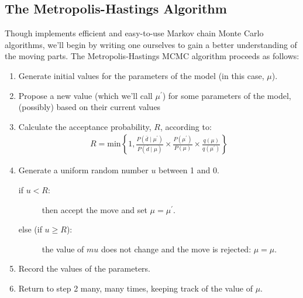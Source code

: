 \subsection{The Metropolis-Hastings Algorithm}\label{sect:MH_algorithm}
Though \RevBayes implements efficient and easy-to-use Markov chain Monte Carlo algorithms, we'll begin by writing one ourselves to gain a better understanding of the moving parts.
The Metropolis-Hastings MCMC algorithm \citep{Metropolis1953,Hastings1970} proceeds as follows:

\begin{enumerate}
	\item Generate initial values for the parameters of the model (in this case, $\mu$).
	\item Propose a new value (which we'll call $\mu^\prime$) for some parameters of the model, (possibly) based on their current values \label{sect:MH:step2}
	\item Calculate the acceptance probability, $R$, according to:
	\begin{align*}
		R = \text{min}\left\{1, \frac{P(\bar d \mid \mu^\prime)}{P(\bar d \mid \mu)} \times \frac{P(\mu^\prime)}{P(\mu)} \times \frac{q(\mu)}{q(\mu^\prime)} \right\}
	\end{align*}\label{sect:MH:step3}
	\item Generate a uniform random number $u$ between 1 and 0. 
    \begin{description}
        \item [if $u<R$:] then accept the move and set $\mu = \mu^\prime$.
        \item [else (if $u\geq R$):] the value of $mu$ does not change and the move is rejected: $\mu = \mu$.
    \end{description}\label{sect:MH:step4}
	\item Record the values of the parameters.\label{sect:MH:step5}
	\item Return to step 2 many, many times, keeping track of the value of $\mu$.\label{sect:MH_alg:step6}
\end{enumerate}

